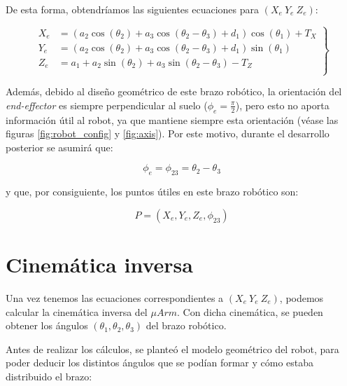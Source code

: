 \documentclass[a4paper,12pt]{article}
\begin{document}
De esta forma, obtendríamos las siguientes ecuaciones para $(X_e ~ Y_e ~ Z_e)$:

\begin{equation} \label{eq:XeYeZe}
    \left.\begin{aligned}
        X_e & = \left(a_{2} \cos{\left(\theta_{2} \right)} + a_{3} \cos{\left(\theta_{2} - \theta_{3} \right)} + d_{1}\right) \cos{\left(\theta_{1} \right)} + T_X \\
        Y_e & = \left(a_{2} \cos{\left(\theta_{2} \right)} + a_{3} \cos{\left(\theta_{2} - \theta_{3} \right)} + d_{1}\right) \sin{\left(\theta_{1} \right)}       \\
        Z_e & = a_{1} + a_{2} \sin{\left(\theta_{2} \right)} + a_{3} \sin{\left(\theta_{2} - \theta_{3} \right)} - T_{Z}                                           \\
    \end{aligned}
    \right\}
\end{equation}

Además, debido al diseño geométrico de este brazo robótico, la orientación del
\textit{end-effector} es siempre perpendicular al suelo ($\phi_e = \frac{\pi}{2}$),
pero esto no aporta información útil al robot, ya que mantiene siempre esta orientación
(véase las figuras \ref{fig:robot_config} y \ref{fig:axis}). Por este motivo,
durante el desarrollo posterior se asumirá que:

\begin{equation} \label{eq:phie_phi23}
    \phi_e = \phi_{23} = \theta_2 - \theta_3
\end{equation}

y que, por consiguiente, los puntos útiles en este brazo robótico son:

\begin{equation} \label{eq:XeYeZePhie}
    P = (X_e, Y_e, Z_e, \phi_{23})
\end{equation}

\newpage

\section{Cinemática inversa}
\label{sec:ik}

Una vez tenemos las ecuaciones correspondientes a $(X_e ~ Y_e ~ Z_e)$, podemos calcular
la cinemática inversa del $\mu Arm$. Con dicha cinemática, se pueden obtener los ángulos
$(\theta_1, \theta_2, \theta_3)$ del brazo robótico.

Antes de realizar los cálculos, se planteó el modelo geométrico del robot, para poder
deducir los distintos ángulos que se podían formar y cómo estaba distribuido el brazo:
\end{document}
